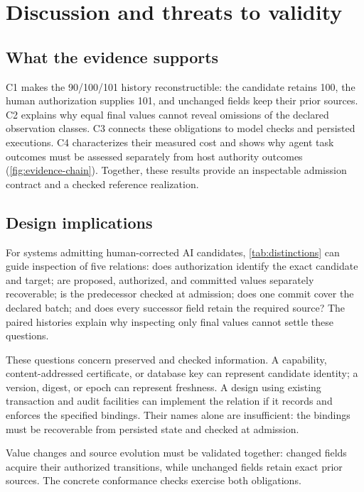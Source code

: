 \section{Discussion and threats to validity}
\label{sec:discussion}

\subsection{What the evidence supports}

C1 makes the 90/100/101 history reconstructible: the candidate retains 100, the human authorization supplies 101, and unchanged fields keep their prior sources. C2 explains why equal final values cannot reveal omissions of the declared observation classes. C3 connects these obligations to model checks and persisted executions. C4 characterizes their measured cost and shows why agent task outcomes must be assessed separately from host authority outcomes (\cref{fig:evidence-chain}). Together, these results provide an inspectable admission contract and a checked reference realization.

\subsection{Design implications}

For systems admitting human-corrected AI candidates, \cref{tab:distinctions} can guide inspection of five relations: does authorization identify the exact candidate and target; are proposed, authorized, and committed values separately recoverable; is the predecessor checked at admission; does one commit cover the declared batch; and does every successor field retain the required source? The paired histories explain why inspecting only final values cannot settle these questions.

These questions concern preserved and checked information. A capability, content-addressed certificate, or database key can represent candidate identity; a version, digest, or epoch can represent freshness. A design using existing transaction and audit facilities can implement the relation if it records and enforces the specified bindings. Their names alone are insufficient: the bindings must be recoverable from persisted state and checked at admission.

Value changes and source evolution must be validated together: changed fields acquire their authorized transitions, while unchanged fields retain exact prior sources. The concrete conformance checks exercise both obligations.

